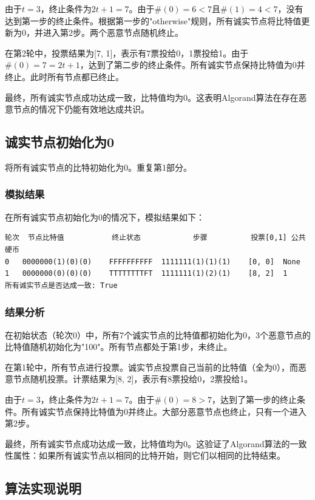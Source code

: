 \documentclass[12pt,a4paper]{article}
\begin{document}
\begin{CJK}{UTF8}{gbsn}
由于$t=3$，终止条件为$2t+1 = 7$。由于$\#(0)=6 < 7$且$\#(1)=4 < 7$，没有达到第一步的终止条件。根据第一步的"otherwise"规则，所有诚实节点将比特值更新为0，并进入第2步。两个恶意节点随机终止。

在第2轮中，投票结果为[7, 1]，表示有7票投给0，1票投给1。由于$\#(0)=7 = 2t+1$，达到了第二步的终止条件。所有诚实节点保持比特值为0并终止。此时所有节点都已终止。

最终，所有诚实节点成功达成一致，比特值均为0。这表明Algorand算法在存在恶意节点的情况下仍能有效地达成共识。

\subsection{诚实节点初始化为0}

将所有诚实节点的比特初始化为0。重复第1部分。

\subsubsection{模拟结果}

在所有诚实节点初始化为0的情况下，模拟结果如下：

\begin{verbatim}
轮次	节点比特值			终止状态			步骤			投票[0,1]	公共硬币
0	0000000(1)(0)(0)	FFFFFFFFFF	1111111(1)(1)(1)	[0, 0]	None
1	0000000(0)(0)(0)	TTTTTTTTFT	1111111(1)(2)(1)	[8, 2]	1
所有诚实节点是否达成一致: True
\end{verbatim}

\subsubsection{结果分析}

在初始状态（轮次0）中，所有7个诚实节点的比特值都初始化为0，3个恶意节点的比特值随机初始化为"100"。所有节点都处于第1步，未终止。

在第1轮中，所有节点进行投票。诚实节点投票自己当前的比特值（全为0），而恶意节点随机投票。计票结果为[8, 2]，表示有8票投给0，2票投给1。

由于$t=3$，终止条件为$2t+1 = 7$。由于$\#(0)=8 > 7$，达到了第一步的终止条件。所有诚实节点保持比特值为0并终止。大部分恶意节点也终止，只有一个进入第2步。

最终，所有诚实节点成功达成一致，比特值均为0。这验证了Algorand算法的一致性属性：如果所有诚实节点以相同的比特开始，则它们以相同的比特结束。

\subsection{算法实现说明}


\end{CJK}
\end{document}
